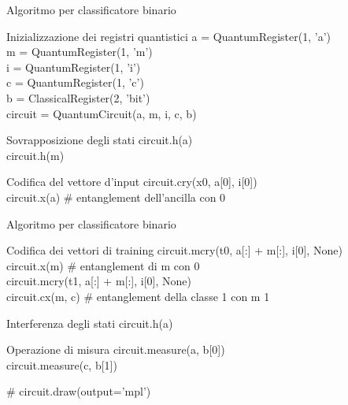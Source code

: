 \documentclass{beamer}
\begin{document}
    \begin{frame}{Algoritmo per classificatore binario}
        \begin{block}{Inizializzazione dei registri quantistici}
            a = QuantumRegister(1, 'a') \\
            m = QuantumRegister(1, 'm') \\
            i = QuantumRegister(1, 'i') \\
            c = QuantumRegister(1, 'c') \\
            b = ClassicalRegister(2, 'bit') \\
            circuit = QuantumCircuit(a, m, i, c, b)
        \end{block}

        \begin{block}{Sovrapposizione degli stati}
            circuit.h(a) \\
            circuit.h(m)
        \end{block}

        \begin{block}{Codifica del vettore d'input}
            circuit.cry(x0, a[0], i[0]) \\
            circuit.x(a) \# entanglement dell'ancilla con 0
        \end{block}
    \end{frame}

    \begin{frame}{Algoritmo per classificatore binario}
        \begin{block}{Codifica dei vettori di training}
            circuit.mcry(t0, a[:] + m[:], i[0], None) \\
            circuit.x(m) \# entanglement di m con 0 \\
            circuit.mcry(t1, a[:] + m[:], i[0], None) \\
            circuit.cx(m, c) \# entanglement della classe 1 con m 1 \\
        \end{block}

        \begin{block}{Interferenza degli stati}
            circuit.h(a)
        \end{block}
        
        \begin{block}{Operazione di misura}
            circuit.measure(a, b[0]) \\
            circuit.measure(c, b[1]) \\
        \end{block}
        \# circuit.draw(output='mpl')
    \end{frame}
\end{document}
